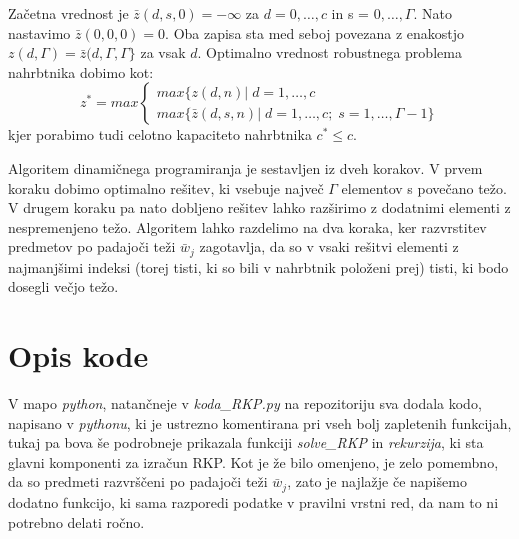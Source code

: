 \documentclass[a4paper,12pt]{article}
\theoremstyle{definition}
\begin{document}
\noindent Začetna vrednost je $\bar{z}(d, s, 0) = -\infty$ za $d = 0, \dots,c$ in s = $0, \dots, \Gamma$. 
Nato nastavimo $\bar{z}(0, 0, 0) = 0$. Oba zapisa sta med seboj povezana z enakostjo $z(d, \Gamma) = 
\bar{z}(d, \Gamma, \Gamma\}$ za vsak $d$. Optimalno vrednost robustnega problema nahrbtnika dobimo kot:
\begin{equation}
\tag*{}
z^{*} = max \begin{cases}
max\{z(d, n) |\; d = 1, \dots, c \\
max\{\bar{z}(d, s, n) |\; d = 1, \dots, c; \;s = 1, \dots, \Gamma -1\}
\end{cases}
\end{equation}
\medskip
kjer porabimo tudi celotno kapaciteto nahrbtnika $c^{*} \leq c$.
\par
Algoritem dinamičnega programiranja je sestavljen iz dveh korakov. V prvem koraku dobimo optimalno 
rešitev, ki vsebuje največ $\Gamma$ elementov s povečano težo. V drugem koraku pa nato dobljeno 
rešitev lahko razširimo z dodatnimi elementi z nespremenjeno težo. Algoritem lahko razdelimo na dva 
koraka, ker razvrstitev predmetov po padajoči teži $\bar{w}_j$ zagotavlja, da so v vsaki rešitvi 
elementi z najmanjšimi indeksi (torej tisti, ki so bili v nahrbtnik položeni prej) tisti, ki bodo 
dosegli večjo težo.

\section{Opis kode}
V mapo \textit{python}, natančneje v \textit{koda\_RKP.py} na repozitoriju sva dodala kodo, napisano v \textit{pythonu}, ki je ustrezno komentirana pri vseh bolj zapletenih 
funkcijah, tukaj pa bova še podrobneje prikazala funkciji \textit{solve\_RKP} in \textit{rekurzija}, ki sta glavni komponenti
za izračun RKP. Kot je že bilo omenjeno, je zelo pomembno, da so predmeti razvrščeni po padajoči teži $\bar{w}_j$, zato je najlažje 
če napišemo dodatno funkcijo, ki sama razporedi podatke v pravilni vrstni red, da nam to ni potrebno delati ročno. 
\medskip
\end{document}
